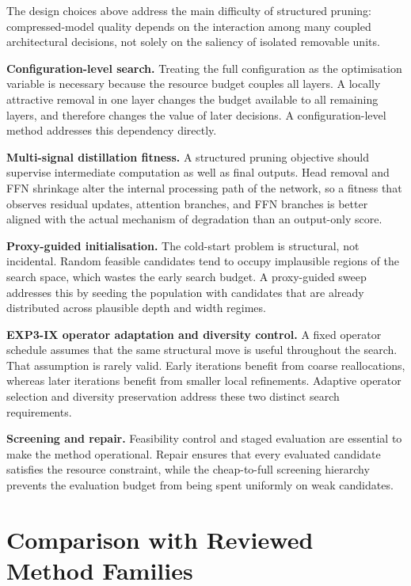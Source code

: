 The design choices above address the main difficulty of structured pruning: compressed-model quality depends on the interaction among many coupled architectural decisions, not solely on the saliency of isolated removable units.

\medskip\noindent\textbf{Configuration-level search.} Treating the full configuration as the optimisation variable is necessary because the resource budget couples all layers. A locally attractive removal in one layer changes the budget available to all remaining layers, and therefore changes the value of later decisions. A configuration-level method addresses this dependency directly.

\medskip\noindent\textbf{Multi-signal distillation fitness.} A structured pruning objective should supervise intermediate computation as well as final outputs. Head removal and FFN shrinkage alter the internal processing path of the network, so a fitness that observes residual updates, attention branches, and FFN branches is better aligned with the actual mechanism of degradation than an output-only score.

\medskip\noindent\textbf{Proxy-guided initialisation.} The cold-start problem is structural, not incidental. Random feasible candidates tend to occupy implausible regions of the search space, which wastes the early search budget. A proxy-guided sweep addresses this by seeding the population with candidates that are already distributed across plausible depth and width regimes.

\medskip\noindent\textbf{EXP3-IX operator adaptation and diversity control.} A fixed operator schedule assumes that the same structural move is useful throughout the search. That assumption is rarely valid. Early iterations benefit from coarse reallocations, whereas later iterations benefit from smaller local refinements. Adaptive operator selection and diversity preservation address these two distinct search requirements.

\medskip\noindent\textbf{Screening and repair.} Feasibility control and staged evaluation are essential to make the method operational. Repair ensures that every evaluated candidate satisfies the resource constraint, while the cheap-to-full screening hierarchy prevents the evaluation budget from being spent uniformly on weak candidates.

\section{Comparison with Reviewed Method Families}
\label{subsec:final_comparison}

